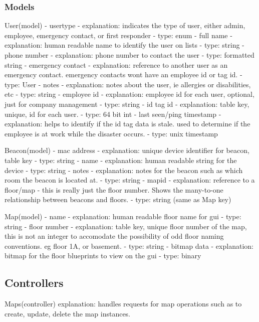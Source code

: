 \subsubsection{Models}

User(model)
	- usertype
		- explanation: indicates the type of user, either admin, employee, emergency contact, or first responder
		- type: enum
	- full name
		- explanation: human readable name to identify the user on lists
		- type: string
	- phone number
		- explanation: phone number to contact the user
		- type: formatted string
	- emergency contact
		- explanation: reference to another user as an emergency contact. emergency contacts wont have an employee id or tag id.
		- type: User
	- notes
		- explanation: notes about the user, ie allergies or disabilities, etc
		- type: string
	- employee id
		- explanation: employee id for each user, optional, just for company management
		- type: string
	- id tag id
		- explanation: table key, unique, id for each user.
		- type: 64 bit int
	- last seen/ping timestamp
		- explanation: helps to identify if the id tag data is stale. used to determine if the employee is at work while the disaster occurs.
		- type: unix timestamp

Beacon(model)
	- mac address
		- explanation: unique device identifier for beacon, table key
		- type: string
	- name
		- explanation: human readable string for the device
		- type: string
	- notes
		- explanation: notes for the beacon such as which room the beacon is located at.
		- type: string
	- mapid
		- explanation: reference to a floor/map - this is really just the floor number. Shows the many-to-one relationship between beacons and floors.
		- type: string (same as Map key)


Map(model)
	- name
		- explanation: human readable floor name for gui
		- type: string
	- floor number
		- explanation: table key, unique floor number of the map, this is not an integer to accomodate the possibility of odd floor naming conventions. eg floor 1A, or basement.
		- type: string
	- bitmap data
		- explanation: bitmap for the floor blueprints to view on the gui
		- type: binary

\subsection{Controllers}
Maps(controller)
	explanation: handles requests for map operations such as to create, update, delete the map instances.

